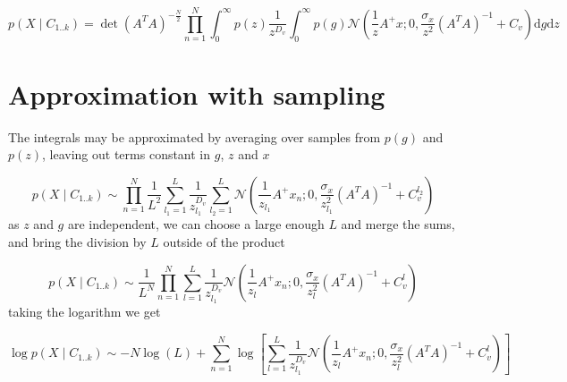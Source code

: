 \documentclass{paper}
\begin{document}
\begin{equation}
p(X \mid C_{1..k}) =  \det(A^T A)^{-\frac{N}{2}} \prod_{n=1}^N \int_{0}^{\infty} p(z) \frac{1}{z^{D_v}}  \int_{0}^{\infty}  p(g) \mathcal{N}(\frac{1}{z} A^{+}x; 0,\frac{\sigma_x}{z^2} (A^T A)^{-1} + C_v) \mathrm{d}g \mathrm{d}z
\end{equation}

\section{Approximation with sampling}

The integrals may be approximated by averaging over samples from $p(g)$ and $p(z)$, leaving out terms constant in $g$, $z$ and $x$

\begin{equation}
p(X \mid C_{1..k}) \sim \prod_{n=1}^N  \frac{1}{L^2} \sum_{l_1=1}^L \frac{1}{z_{l_1}^{D_v}}  \sum_{l_2=1}^L \mathcal{N}(\frac{1}{z_{l_1}} A^{+}x_n; 0,\frac{\sigma_x}{z_{l_1}^2} (A^T A)^{-1} + C_v^{l_2})
\end{equation}
% 
as $z$ and $g$ are independent, we can choose a large enough $L$ and merge the sums, and bring the division by $L$ outside of the product

\begin{equation}
p(X \mid C_{1..k}) \sim \frac{1}{L^N} \prod_{n=1}^N  \sum_{l=1}^L \frac{1}{z_{l_1}^{D_v}}  \mathcal{N}(\frac{1}{z_l} A^{+}x_n; 0,\frac{\sigma_x}{z_l^2} (A^T A)^{-1} + C_v^l)
\end{equation}
%
taking the logarithm we get

\begin{equation}
\log p(X \mid C_{1..k}) \sim - N \log(L) + \sum_{n=1}^N \log \left[ \sum_{l=1}^L \frac{1}{z_{l_1}^{D_v}}  \mathcal{N}(\frac{1}{z_l} A^{+}x_n; 0,\frac{\sigma_x}{z_l^2} (A^T A)^{-1} + C_v^l) \right]
\end{equation}
\end{document}
